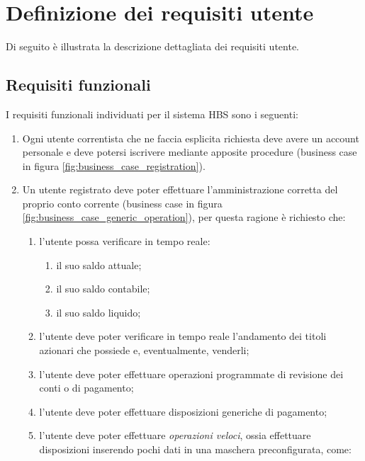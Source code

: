 
\section{Definizione dei requisiti utente}

Di seguito \`e illustrata la descrizione dettagliata dei requisiti utente.

\subsection{Requisiti funzionali}

I requisiti funzionali individuati per il sistema HBS sono i seguenti:

\begin{enumerate}
	\item \label{itm:utente:funzionali:iscrizione} Ogni utente correntista che ne faccia esplicita richiesta deve avere un account personale e deve potersi iscrivere  mediante apposite procedure (business case in figura \ref{fig:business_case_registration}).
	\item \label{itm:utente:funzionali:gestione-conto} Un utente registrato deve poter effettuare l'amministrazione corretta del proprio conto corrente (business case in figura \ref{fig:business_case_generic_operation}), per questa ragione è richiesto che:
	\begin{enumerate}
		\item \label{itm:utente:funzionali:gestione-conto:verifica-saldo} l'utente possa verificare in tempo reale:
			\begin{enumerate}
				\item il suo saldo attuale;
				\item il suo saldo contabile;
				\item il suo saldo liquido;
			\end{enumerate} 
		\item \label{itm:utente:funzionali:gestione-conto:verifica-andamento} l'utente deve poter verificare in tempo reale l'andamento dei titoli azionari che possiede e, eventualmente, venderli;
		\item \label{itm:utente:funzionali:gestione-conto:revisione} l'utente deve poter effettuare operazioni programmate di revisione dei conti o di pagamento;
		\item \label{itm:utente:funzionali:gestione-conto:operazioni} l'utente deve poter effettuare disposizioni generiche di pagamento;
		\item \label{itm:utente:funzionali:gestione-conto:operazioni-veloci} l'utente deve poter effettuare \emph{operazioni veloci}, ossia effettuare disposizioni inserendo pochi dati in una maschera preconfigurata, come:

\end{enumerate}
\end{enumerate}
